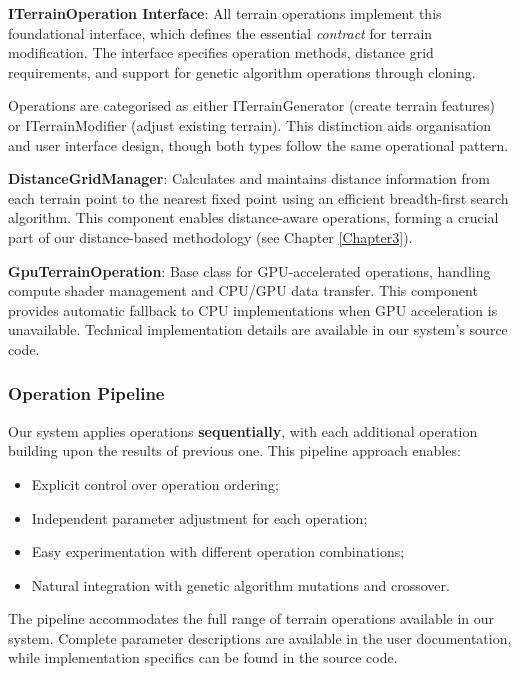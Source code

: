 \textbf{\textsf{ITerrainOperation} Interface}: All terrain operations implement this foundational interface, which defines the essential \textit{contract} for terrain modification. The interface specifies operation methods, distance grid requirements, and support for genetic algorithm operations through cloning.

Operations are categorised as either \textsf{ITerrainGenerator} (create terrain features) or \textsf{ITerrainModifier} (adjust existing terrain). This distinction aids organisation and user interface design, though both types follow the same operational pattern.
    
\textbf{\textsf{DistanceGridManager}}: Calculates and maintains distance information from each terrain point to the nearest fixed point using an efficient breadth-first search algorithm. This component enables distance-aware operations, forming a crucial part of our distance-based methodology (see Chapter \ref{Chapter3}).


\textbf{\textsf{GpuTerrainOperation}}: Base class for GPU-accelerated operations, handling compute shader management and CPU/GPU data transfer. This component provides automatic fallback to CPU implementations when GPU acceleration is unavailable. Technical implementation details are available in our system's source code.

\subsubsection{Operation Pipeline}

Our system applies operations \textbf{sequentially}, with each additional operation building upon the results of previous one. This pipeline approach enables:
\begin{itemize}
    \item Explicit control over operation ordering;
    \item Independent parameter adjustment for each operation;
    \item Easy experimentation with different operation combinations;
    \item Natural integration with genetic algorithm mutations and crossover.
\end{itemize}

The pipeline accommodates the full range of terrain operations available in our system. Complete parameter descriptions are available in the user documentation, while implementation specifics can be found in the source code.

